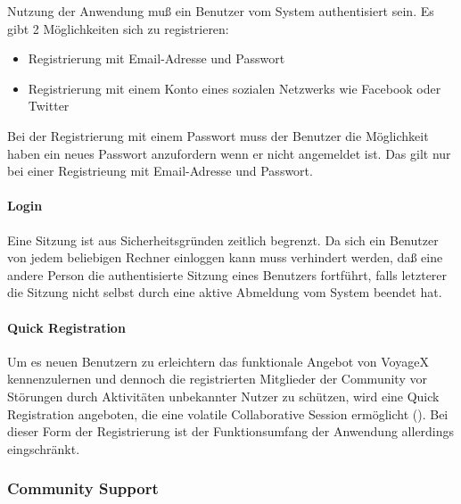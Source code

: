  Nutzung der Anwendung muß ein Benutzer vom System authentisiert sein. Es gibt 2 Möglichkeiten sich 
zu registrieren:
\begin{itemize}
	\item Registrierung mit Email-Adresse und Passwort
	\item Registrierung mit einem Konto eines sozialen Netzwerks wie Facebook oder Twitter
\end{itemize}
\noindent Bei der Registrierung mit einem Passwort muss der Benutzer die Möglichkeit haben ein neues Passwort anzufordern wenn er nicht angemeldet ist. Das gilt nur bei einer Registrieung mit Email-Adresse und Passwort.

\paragraph{Login}
Eine Sitzung ist aus Sicherheitsgründen zeitlich begrenzt. Da sich ein Benutzer von jedem beliebigen Rechner einloggen kann muss verhindert werden, daß eine andere Person die authentisierte Sitzung eines Benutzers fortführt, falls letzterer die Sitzung nicht selbst durch eine aktive Abmeldung vom System beendet hat. 

\paragraph{Quick Registration}
Um es neuen Benutzern zu erleichtern das funktionale Angebot von VoyageX kennenzulernen und dennoch die registrierten 
Mitglieder der Community vor Störungen durch Aktivitäten unbekannter Nutzer zu schützen, wird eine Quick Registration angeboten, die eine volatile Collaborative Session ermöglicht (\cite[S. 72ff.]{SCLU:PFCMI}).
Bei dieser Form der Registrierung ist der Funktionsumfang der Anwendung allerdings eingschränkt.


\subsubsection{Community Support}
